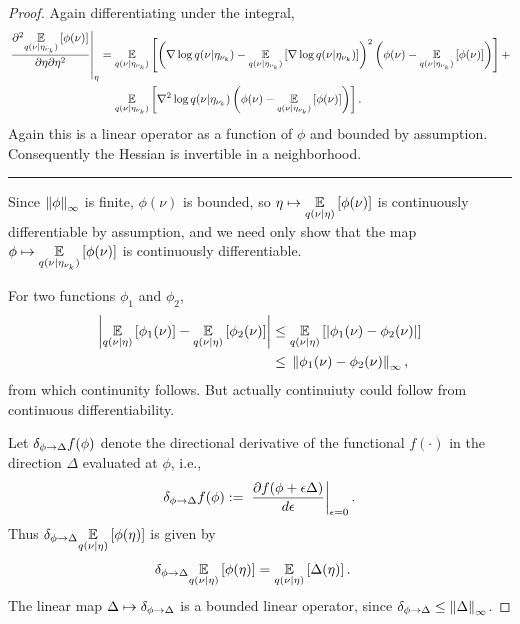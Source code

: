 \begin{thm}
\begin{proof}
Again differentiating under the integral,
%
\begin{align*}
%
\fracat{\partial^2 \expect{\q(\nu \vert \etanuk)}
              {\phi(\nu)}}{\partial \eta \partial \eta^2}{\eta} ={}&
\expect{\q(\nu \vert \etanuk)}
       {\left(\nabla \log \q(\nu \vert \etanuk)
         - \expect{\q(\nu \vert \etanuk)}
                  {\nabla \log \q(\nu \vert \etanuk)}
       \right)^2
       \left( \phi(\nu) - \expect{\q(\nu \vert \etanuk)}{\phi(\nu)} \right)} +
\\&
\expect{\q(\nu \vert \etanuk)}
       {\nabla^2 \log \q(\nu \vert \etanuk)
       \left( \phi(\nu) - \expect{\q(\nu \vert \etanuk)}{\phi(\nu)} \right)}.
%
\end{align*}
%
Again this is a linear operator as a function of $\phi$ and bounded by
assumption.  Consequently the Hessian is invertible in a neighborhood.

\noindent\rule{\textwidth}{1pt}


Since $\left\Vert\phi\right\Vert_{\infty}$ is finite, $\phi(\nu)$ is
bounded, so $\eta \mapsto \underset{q(\nu \vert \eta)}{\mathbb{E}}\left[\phi(\nu)\right]$ is
continuously differentiable by assumption, and we need only show that the map
$\phi \mapsto \underset{q(\nu \vert \eta_{\nu_{k}})}{\mathbb{E}}\left[\phi(\nu)\right]$ is continuously
differentiable.

For two functions $\phi_1$ and $\phi_2$,
%
\begin{align*}
%
\abs{\expect{\q(\nu \vert \eta)}{\phi_1(\nu)} -
     \expect{\q(\nu \vert \eta)}{\phi_2(\nu)}}
\le{}&
\expect{\q(\nu \vert \eta)}{\abs{\phi_1(\nu) - \phi_2(\nu)}}\\
\le{}&
\norminf{\phi_1(\nu) - \phi_2(\nu)},
%
\end{align*}
%
from which continunity follows.  But actually continuiuty could follow from
continuous differentiability.

Let $\delta_{\phi\rightarrow\Delta} f(\phi)$ denote the directional derivative of the functional
$f(\cdot)$ in the direction $\Delta$ evaluated at $\phi$, i.e.,
%
\begin{align*}
%
\dirderiv{\phi}{\Delta} f(\phi) :={}
\fracat{\partial f(\phi + \epsilon \Delta)}{d\epsilon}{\epsilon=0}.
%
\end{align*}
%
Thus $\delta_{\phi\rightarrow\Delta} \underset{q(\nu \vert \eta)}{\mathbb{E}}\left[\phi(\eta)\right]$
is given by
%
\begin{align*}
%
\dirderiv{\phi}{\Delta} \expect{\q(\nu \vert \eta)}{\phi(\eta)} ={}&
    \expect{\q(\nu \vert \eta)}{\Delta(\eta)}.
%
\end{align*}
%
The linear map $\Delta \mapsto \delta_{\phi\rightarrow\Delta}$ is a bounded
linear operator, since $\delta_{\phi\rightarrow\Delta} \le \left\Vert\Delta\right\Vert_{\infty}$.


\end{proof}
\end{thm}
